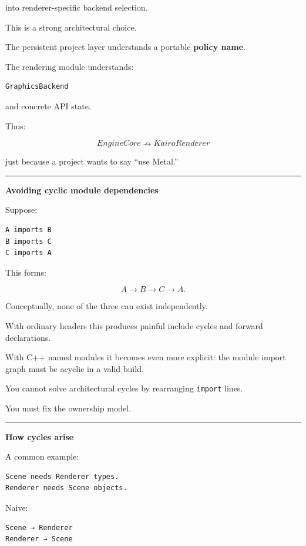 into renderer-specific backend selection.

This is a strong architectural choice.

The persistent project layer understands a portable \textbf{policy name}.

The rendering module understands:

\begin{verbatim}
GraphicsBackend
\end{verbatim}

and concrete API state.

Thus:

\[
EngineCore\nrightarrow KairoRenderer
\]

just because a project wants to say ``use Metal.''

\begin{center}\rule{0.5\linewidth}{0.5pt}\end{center}

\textbf{Avoiding cyclic module dependencies}

Suppose:

\begin{verbatim}
A imports B
B imports C
C imports A
\end{verbatim}

This forms:

\[
A\rightarrow B\rightarrow C\rightarrow A.
\]

Conceptually, none of the three can exist independently.

With ordinary headers this produces painful include cycles and forward declarations.

With C++ named modules it becomes even more explicit: the module import graph must be acyclic in a valid build.

You cannot solve architectural cycles by rearranging \texttt{import} lines.

You must fix the ownership model.

\begin{center}\rule{0.5\linewidth}{0.5pt}\end{center}

\textbf{How cycles arise}

A common example:

\begin{verbatim}
Scene needs Renderer types.
Renderer needs Scene objects.
\end{verbatim}

Naive:

\begin{verbatim}
Scene → Renderer
Renderer → Scene
\end{verbatim}

